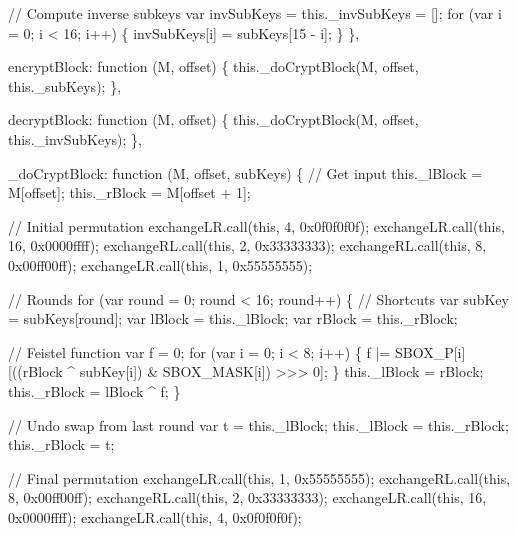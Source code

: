 \begin{DoxyCodeInclude}
            \textcolor{comment}{// Compute inverse subkeys}
            var invSubKeys = this.\_invSubKeys = [];
            \textcolor{keywordflow}{for} (var i = 0; i < 16; i++) \{
                invSubKeys[i] = subKeys[15 - i];
            \}
        \},

        encryptBlock: \textcolor{keyword}{function} (M, offset) \{
            this.\_doCryptBlock(M, offset, this.\_subKeys);
        \},

        decryptBlock: \textcolor{keyword}{function} (M, offset) \{
            this.\_doCryptBlock(M, offset, this.\_invSubKeys);
        \},

        \_doCryptBlock: \textcolor{keyword}{function} (M, offset, subKeys) \{
            \textcolor{comment}{// Get input}
            this.\_lBlock = M[offset];
            this.\_rBlock = M[offset + 1];

            \textcolor{comment}{// Initial permutation}
            exchangeLR.call(\textcolor{keyword}{this}, 4,  0x0f0f0f0f);
            exchangeLR.call(\textcolor{keyword}{this}, 16, 0x0000ffff);
            exchangeRL.call(\textcolor{keyword}{this}, 2,  0x33333333);
            exchangeRL.call(\textcolor{keyword}{this}, 8,  0x00ff00ff);
            exchangeLR.call(\textcolor{keyword}{this}, 1,  0x55555555);

            \textcolor{comment}{// Rounds}
            \textcolor{keywordflow}{for} (var round = 0; round < 16; round++) \{
                \textcolor{comment}{// Shortcuts}
                var subKey = subKeys[round];
                var lBlock = this.\_lBlock;
                var rBlock = this.\_rBlock;

                \textcolor{comment}{// Feistel function}
                var f = 0;
                \textcolor{keywordflow}{for} (var i = 0; i < 8; i++) \{
                    f |= SBOX\_P[i][((rBlock ^ subKey[i]) & SBOX\_MASK[i]) >>> 0];
                \}
                this.\_lBlock = rBlock;
                this.\_rBlock = lBlock ^ f;
            \}

            \textcolor{comment}{// Undo swap from last round}
            var t = this.\_lBlock;
            this.\_lBlock = this.\_rBlock;
            this.\_rBlock = t;

            \textcolor{comment}{// Final permutation}
            exchangeLR.call(\textcolor{keyword}{this}, 1,  0x55555555);
            exchangeRL.call(\textcolor{keyword}{this}, 8,  0x00ff00ff);
            exchangeRL.call(\textcolor{keyword}{this}, 2,  0x33333333);
            exchangeLR.call(\textcolor{keyword}{this}, 16, 0x0000ffff);
            exchangeLR.call(\textcolor{keyword}{this}, 4,  0x0f0f0f0f);


\end{DoxyCodeInclude}
